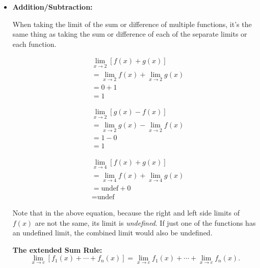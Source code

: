 \documentclass[12pt]{article}
\begin{document}
            \begin{itemize}
                \item \textbf{Addition/Subtraction:}

                    When taking the limit of the sum or difference of multiple functions, it's the same thing as taking the sum or difference of each of the separate limits or each function.

                    \begin{align*}
                        &\lim_{x \to 2} \left[ f(x) + g(x) \right] \\
                        &= \lim_{x \to 2} f(x) + \lim_{x \to 2} g(x) \\
                        &= 0 + 1 \\
                        &= 1
                    \end{align*}

                    \begin{align*}
                        &\lim_{x \to 2} \left[ g(x) - f(x) \right] \\
                        &= \lim_{x \to 2} g(x) - \lim_{x \to 2} f(x) \\
                        &= 1 - 0 \\
                        &= 1
                    \end{align*}

                    \begin{align*}
                        &\lim_{x \to 4} \left[ f(x) + g(x) \right] \\
                        &= \lim_{x \to 4} f(x) + \lim_{x \to 4} g(x) \\
                        &= \text{undef} + 0 \\
                        &= \text{undef}
                    \end{align*}

                    \indent Note that in the above equation, because the right and left side limits of $f(x)$ are not the same, its limit is \textit{undefined}. If just one of the functions has an undefined limit, the combined limit would also be undefined.

                    \noindent\textbf{The extended Sum Rule:}
                    \begin{equation*}
                        \lim_{x \to c} \left[ f_1(x) + \cdots + f_n(x) \right]
                        = \lim_{x \to c} f_1(x) + \cdots + \lim_{x \to c} f_n(x).
                    \end{equation*}
                    \smallskip


\end{itemize}
\end{document}
